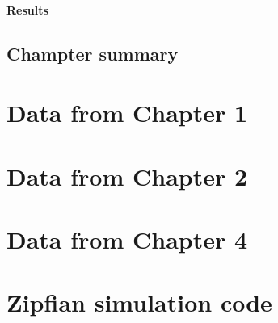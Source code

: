\documentclass{upenndiss}
\begin{document}
\subsubsection{Results}
\section{Champter summary}
\lipsum

\appendix

\chapter{Data from Chapter 1}


\chapter{Data from Chapter 2}


\chapter{Data from Chapter 4}
\lipsum


\chapter{Zipfian simulation code}

\lstset{language=Python, basicstyle=\scriptsize\ttfamily, showstringspaces=false, upquote=false}




\end{document}
